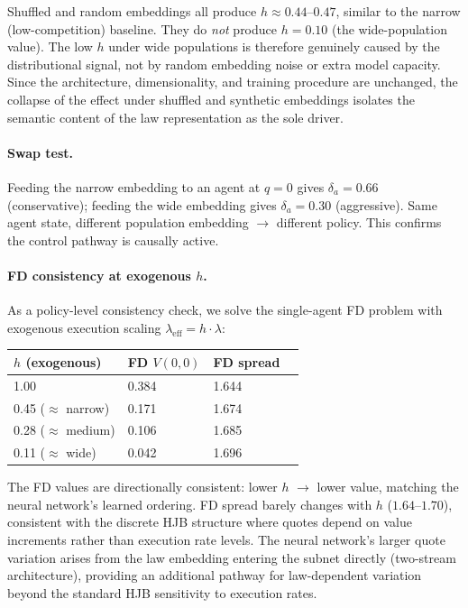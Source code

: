 \documentclass[11pt,a4paper]{article}
\begin{document}
Shuffled and random embeddings all produce $h \approx 0.44$--$0.47$, similar to the narrow (low-competition) baseline. They do \emph{not} produce $h = 0.10$ (the wide-population value). The low $h$ under wide populations is therefore genuinely caused by the distributional signal, not by random embedding noise or extra model capacity. Since the architecture, dimensionality, and training procedure are unchanged, the collapse of the effect under shuffled and synthetic embeddings isolates the semantic content of the law representation as the sole driver.

\paragraph{Swap test.}
Feeding the narrow embedding to an agent at $q = 0$ gives $\delta_a = 0.66$ (conservative); feeding the wide embedding gives $\delta_a = 0.30$ (aggressive). Same agent state, different population embedding $\to$ different policy. This confirms the control pathway is causally active.

\paragraph{FD consistency at exogenous $h$.}
As a policy-level consistency check, we solve the single-agent FD problem with exogenous execution scaling $\lambda_{\text{eff}} = h \cdot \lambda$:

\begin{center}
\begin{tabular}{llll}
\toprule
$h$ (exogenous) & FD $V(0,0)$ & FD spread \\
\midrule
1.00 & 0.384 & 1.644 \\
0.45 ($\approx$ narrow) & 0.171 & 1.674 \\
0.28 ($\approx$ medium) & 0.106 & 1.685 \\
0.11 ($\approx$ wide) & 0.042 & 1.696 \\
\bottomrule
\end{tabular}
\end{center}

The FD values are directionally consistent: lower $h$ $\to$ lower value, matching the neural network's learned ordering. FD spread barely changes with $h$ ($1.64$--$1.70$), consistent with the discrete HJB structure where quotes depend on value increments rather than execution rate levels. The neural network's larger quote variation arises from the law embedding entering the subnet directly (two-stream architecture), providing an additional pathway for law-dependent variation beyond the standard HJB sensitivity to execution rates.
\end{document}
